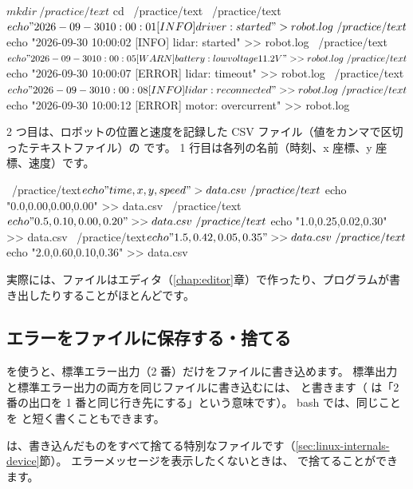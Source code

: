 \begin{terminal}[練習用のログファイルを作る]
$ mkdir ~/practice/text
$ cd ~/practice/text
~/practice/text$ echo "2026-09-30 10:00:01 [INFO] driver: started" > robot.log
~/practice/text$ echo "2026-09-30 10:00:02 [INFO] lidar: started" >> robot.log
~/practice/text$ echo "2026-09-30 10:00:05 [WARN] battery: low voltage 11.2V" >> robot.log
~/practice/text$ echo "2026-09-30 10:00:07 [ERROR] lidar: timeout" >> robot.log
~/practice/text$ echo "2026-09-30 10:00:08 [INFO] lidar: reconnected" >> robot.log
~/practice/text$ echo "2026-09-30 10:00:12 [ERROR] motor: overcurrent" >> robot.log
\end{terminal}

2 つ目は、ロボットの位置と速度を記録した CSV ファイル（値をカンマで区切ったテキストファイル）の  です。
1 行目は各列の名前（時刻、x 座標、y 座標、速度）です。

\begin{terminal}
~/practice/text$ echo "time,x,y,speed" > data.csv
~/practice/text$ echo "0.0,0.00,0.00,0.00" >> data.csv
~/practice/text$ echo "0.5,0.10,0.00,0.20" >> data.csv
~/practice/text$ echo "1.0,0.25,0.02,0.30" >> data.csv
~/practice/text$ echo "1.5,0.42,0.05,0.35" >> data.csv
~/practice/text$ echo "2.0,0.60,0.10,0.36" >> data.csv
\end{terminal}

実際には、ファイルはエディタ（\ref{chap:editor}章）で作ったり、プログラムが書き出したりすることがほとんどです。

\subsection{エラーをファイルに保存する・捨てる}

 を使うと、標準エラー出力（2 番）だけをファイルに書き込めます。
標準出力と標準エラー出力の両方を同じファイルに書き込むには、 と書きます（ は「2 番の出口を 1 番と同じ行き先にする」という意味です）。
bash では、同じことを  と短く書くこともできます。


 は、書き込んだものをすべて捨てる特別なファイルです（\ref{sec:linux-internals-device}節）。
エラーメッセージを表示したくないときは、 で捨てることができます。

